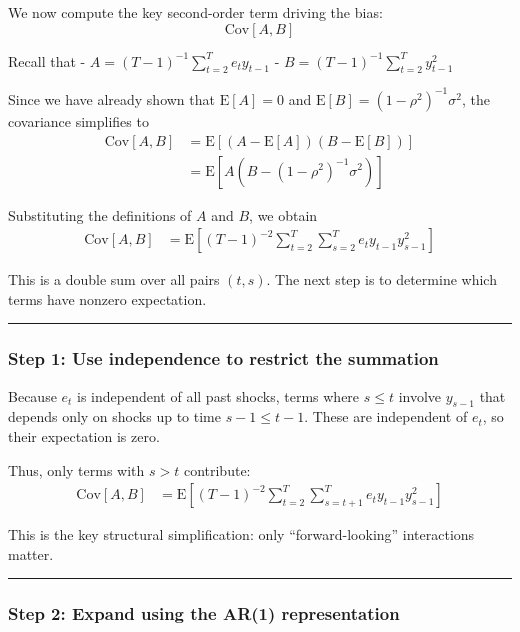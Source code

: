 \documentclass[11pt]{article}
\begin{document}
We now compute the key second-order term driving the bias: \[
\text{Cov}[A,B]
\]

Recall that - \(A = (T-1)^{-1}\sum_{t=2}^T e_t y_{t-1}\) -
\(B = (T-1)^{-1}\sum_{t=2}^T y_{t-1}^2\)

Since we have already shown that \(\text{E}[A] = 0\) and
\(\text{E}[B] = (1-\rho^2)^{-1}\sigma^2\), the covariance simplifies to
\[
\begin{aligned}
\text{Cov}[A,B]
&=\text{E}[(A-\text{E}[A])(B-\text{E}[B])]\\
&=\text{E}\left[A\left(B-(1-\rho^2)^{-1}\sigma^2\right)\right]
\end{aligned}
\]

Substituting the definitions of \(A\) and \(B\), we obtain \[
\begin{aligned}
\text{Cov}[A,B]
&=\text{E}\left[(T-1)^{-2}\sum_{t=2}^T\sum_{s=2}^T e_t y_{t-1}y_{s-1}^2\right]
\end{aligned}
\]

This is a double sum over all pairs \((t,s)\). The next step is to
determine which terms have nonzero expectation.

\begin{center}\rule{0.5\linewidth}{0.5pt}\end{center}

\subsubsection{Step 1: Use independence to restrict the
summation}\label{step-1-use-independence-to-restrict-the-summation}

Because \(e_t\) is independent of all past shocks, terms where
\(s \le t\) involve \(y_{s-1}\) that depends only on shocks up to time
\(s-1 \le t-1\). These are independent of \(e_t\), so their expectation
is zero.

Thus, only terms with \(s > t\) contribute: \[
\begin{aligned}
\text{Cov}[A,B]
&=\text{E}\left[(T-1)^{-2}\sum_{t=2}^T\sum_{s=t+1}^T e_t y_{t-1}y_{s-1}^2\right]
\end{aligned}
\]

This is the key structural simplification: only ``forward-looking''
interactions matter.

\begin{center}\rule{0.5\linewidth}{0.5pt}\end{center}

\subsubsection{Step 2: Expand using the AR(1)
representation}\label{step-2-expand-using-the-ar1-representation}
\end{document}
